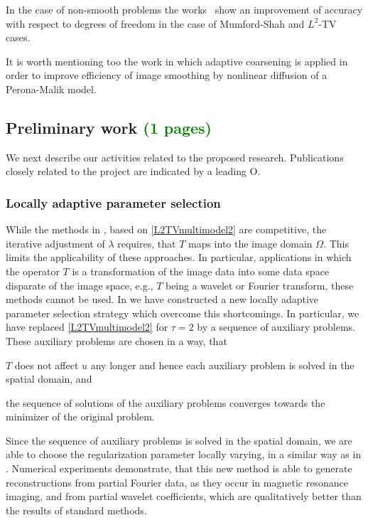 \documentclass[enabledeprecatedfontcommands,cleardoublepage=empty,headsepline,twoside,11pt,DIV=15,BCOR=12mm,final]{scrartcl}
\begin{document}
In the case  of non-smooth problems the works~\cite{DoMoNo:08,Bartels:15a} show an improvement of accuracy with respect to degrees of freedom in the case of Mumford-Shah and $L^2$-TV cases. %

It is worth mentioning too the work \cite{BanschMikula:97} in which adaptive coarsening is applied in order to improve efficiency of image smoothing by nonlinear diffusion of a Perona-Malik model.




\subsection{Preliminary work \textcolor{green}{(1 pages)}}\label{sec:prelim}

We next describe our activities related to the proposed research. Publications closely related to the project are indicated by a leading O.
\subsubsection{Locally adaptive parameter selection}\label{SecO:LocallyAdaptiveParameterSelection}



While the methods in \cite{DoHiRi:11, HintermullerRincon-Camacho:10}, based on \eqref{L2TVmultimodel2} are competitive, the iterative adjustment of $\lambda$ requires, that $T$ maps into the image domain $\Omega$. This limits the applicability of these approaches. In particular, applications in which the operator $T$ is a transformation of the image data into some data space disparate of the image space, e.g., $T$ being a wavelet or Fourier transform, these methods cannot be used. In  we have constructed a new locally adaptive parameter selection strategy which overcome this shortcomings. In particular, we have replaced \eqref{L2TVmultimodel2} for $\tau=2$ by a sequence of auxiliary problems. These auxiliary problems are chosen in a way, that
\begin{inparaenum}[(i)]
\item $T$ does not affect $u$ any longer and hence each auxiliary problem is solved in the spatial domain, and
\item the sequence of solutions of the auxiliary problems converges towards the minimizer of the original problem.
\end{inparaenum}
Since the sequence of auxiliary problems is solved in the spatial domain, we are able to choose the regularization parameter locally varying, in a similar way as in \cite{DoHiRi:11}.  Numerical experiments demonstrate, that this new method is able to generate reconstructions from partial Fourier data, as they occur in magnetic resonance imaging, and from partial wavelet coefficients, which are qualitatively better than the results of standard methods.
\end{document}
